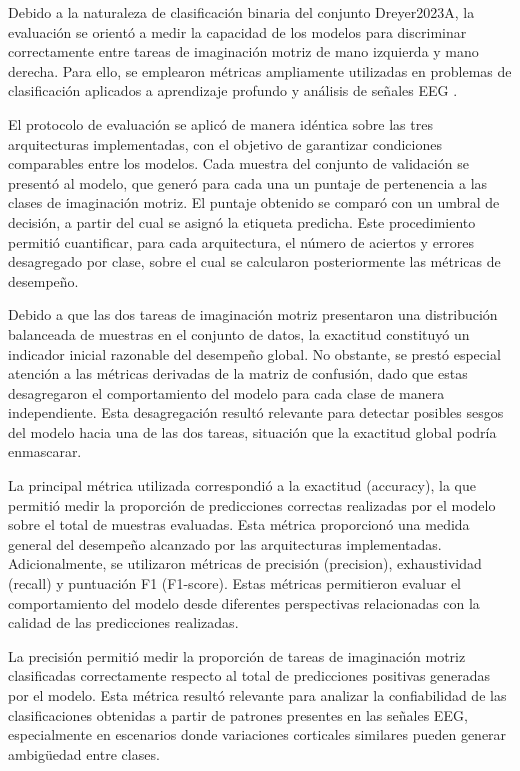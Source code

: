 Debido a la naturaleza de clasificación binaria del conjunto Dreyer2023A, la evaluación se orientó a medir la capacidad de los modelos para discriminar correctamente entre tareas de imaginación motriz de mano izquierda y mano derecha. Para ello, se emplearon métricas ampliamente utilizadas en problemas de clasificación aplicados a aprendizaje profundo y análisis de señales EEG \cite{roy2019deep, zhang2021eeg}.

El protocolo de evaluación se aplicó de manera idéntica sobre las tres arquitecturas implementadas, con el objetivo de garantizar condiciones comparables entre los modelos. Cada muestra del conjunto de validación se presentó al modelo, que generó para cada una un puntaje de pertenencia a las clases de imaginación motriz. El puntaje obtenido se comparó con un umbral de decisión, a partir del cual se asignó la etiqueta predicha. Este procedimiento permitió cuantificar, para cada arquitectura, el número de aciertos y errores desagregado por clase, sobre el cual se calcularon posteriormente las métricas de desempeño.

Debido a que las dos tareas de imaginación motriz presentaron una distribución balanceada de muestras en el conjunto de datos, la exactitud constituyó un indicador inicial razonable del desempeño global. No obstante, se prestó especial atención a las métricas derivadas de la matriz de confusión, dado que estas desagregaron el comportamiento del modelo para cada clase de manera independiente. Esta desagregación resultó relevante para detectar posibles sesgos del modelo hacia una de las dos tareas, situación que la exactitud global podría enmascarar.

La principal métrica utilizada correspondió a la exactitud (accuracy), la que permitió medir la proporción de predicciones correctas realizadas por el modelo sobre el total de muestras evaluadas. Esta métrica proporcionó una medida general del desempeño alcanzado por las arquitecturas implementadas. Adicionalmente, se utilizaron métricas de precisión (precision), exhaustividad (recall) y puntuación F1 (F1-score). Estas métricas permitieron evaluar el comportamiento del modelo desde diferentes perspectivas relacionadas con la calidad de las predicciones realizadas.

La precisión permitió medir la proporción de tareas de imaginación motriz clasificadas correctamente respecto al total de predicciones positivas generadas por el modelo. Esta métrica resultó relevante para analizar la confiabilidad de las clasificaciones obtenidas a partir de patrones presentes en las señales EEG, especialmente en escenarios donde variaciones corticales similares pueden generar ambigüedad entre clases.

